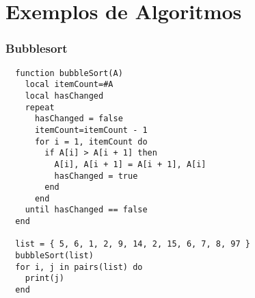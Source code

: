 \documentclass{ime-beamer}
\begin{document}
\section{Exemplos de Algoritmos}
\begin{frame}[fragile]
  \frametitle{Bubblesort}
  \begin{lstlisting}
  function bubbleSort(A)
    local itemCount=#A
    local hasChanged
    repeat
      hasChanged = false
      itemCount=itemCount - 1
      for i = 1, itemCount do
        if A[i] > A[i + 1] then
          A[i], A[i + 1] = A[i + 1], A[i]
          hasChanged = true
        end
      end
    until hasChanged == false
  end

  list = { 5, 6, 1, 2, 9, 14, 2, 15, 6, 7, 8, 97 }
  bubbleSort(list)
  for i, j in pairs(list) do
    print(j)
  end
  \end{lstlisting}
\end{frame}


\end{document}
